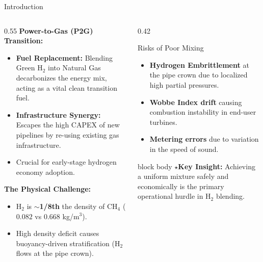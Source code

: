 \documentclass[10pt, aspectratio=169]{beamer}
\newcommand{\keyinsight}[1]{%
  \begin{beamercolorbox}[wd=\textwidth, sep=6pt, rounded=true]{block body}
    \textcolor{iitdNavy}{\textbf{\small$\star$\;Key Insight:}}\;
    {\small #1}
  \end{beamercolorbox}%
}
\begin{document}
\begin{frame}{Introduction}
    \begin{columns}[T]
        \begin{column}{0.55\textwidth}
            \textbf{Power-to-Gas (P2G) Transition:}
            \begin{itemize}
                \item \textbf{Fuel Replacement:} Blending Green H$_2$ into Natural Gas decarbonizes the energy mix, acting as a vital clean transition fuel.
                \item \textbf{Infrastructure Synergy:} Escapes the high CAPEX of new pipelines by re-using existing gas infrastructure.
                \item Crucial for early-stage hydrogen economy adoption.
            \end{itemize}

            \vspace{0.4em}
            \textbf{The Physical Challenge:}
            \begin{itemize}
                \item H$_2$ is \textbf{$\sim$1/8th} the density of CH$_4$ ($0.082$ vs $0.668$ kg/m$^3$).
                \item High density deficit causes buoyancy-driven \alert{stratification} (H$_2$ flows at the pipe crown).
            \end{itemize}
        \end{column}
        \begin{column}{0.42\textwidth}
            \begin{alertblock}{Risks of Poor Mixing}
                \small
                \begin{itemize}
                    \item \textbf{Hydrogen Embrittlement} at the pipe crown due to localized high partial pressures.
                    \item \textbf{Wobbe Index drift} causing combustion instability in end-user turbines.
                    \item \textbf{Metering errors} due to variation in the speed of sound.
                \end{itemize}
            \end{alertblock}
            
            \vspace{0.2em}
            \keyinsight{Achieving a uniform mixture safely and economically is the primary operational hurdle in H$_2$ blending.}
        \end{column}
    \end{columns}
\end{frame}
\end{document}
